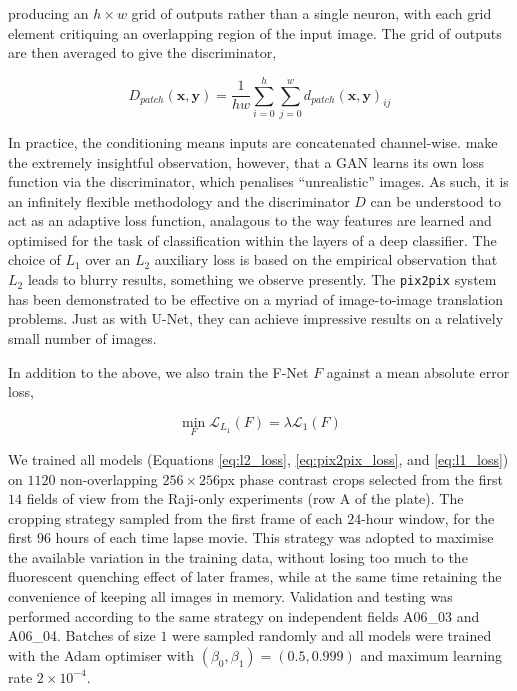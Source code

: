 producing an $h\times w$ grid of outputs rather than a single neuron, with each grid element critiquing an overlapping region of the input image. The grid of outputs are then averaged to give the discriminator,

\begin{equation}
D_{patch}(\mathbf{x}, \mathbf{y}) = \frac{1}{hw}\sum_{i=0}^h\sum_{j=0}^w d_{patch}(\mathbf{x}, \mathbf{y})_{ij}
\end{equation}

In practice, the conditioning means inputs are concatenated channel-wise. \cite{isola2017image} make the extremely insightful observation, however, that a GAN learns its own loss function via the discriminator, which penalises ``unrealistic'' images. As such, it is an infinitely flexible methodology and the discriminator $D$ can be understood to act as an adaptive loss function, analagous to the way features are learned and optimised for the task of classification within the layers of a deep classifier. The choice of $L_1$ over an $L_2$ auxiliary loss is based on the empirical observation that $L_2$ leads to blurry results, something we observe presently. The \texttt{pix2pix} system has been demonstrated to be effective on a myriad of image-to-image translation problems. Just as with U-Net, they can achieve impressive results on a relatively small number of images.

In addition to the above, we also train the F-Net $F$ against a mean absolute error loss,

\begin{equation}
\min_F\mathcal{L}_{L_1}(F) = \lambda\mathcal{L}_{1}(F)
\label{eq:l1_loss}
\end{equation}

We trained all models (Equations \ref{eq:l2_loss}, \ref{eq:pix2pix_loss}, and \ref{eq:l1_loss}) on $1120$ non-overlapping $256\times256$px phase contrast crops selected from the first $14$ fields of view from the Raji-only experiments (row A of the plate). The cropping strategy sampled from the first frame of each $24$-hour window, for the first $96$ hours of each time lapse movie. This strategy was adopted to maximise the available variation in the training data, without losing too much to the fluorescent quenching effect of later frames, while at the same time retaining the convenience of keeping all images in memory.   Validation and testing was performed according to the same strategy on independent fields A06\_03 and A06\_04. Batches of size $1$ were sampled randomly and all models were trained with the Adam optimiser with $(\beta_0, \beta_1) = (0.5, 0.999)$ and maximum learning rate $2\times10^{-4}$.

